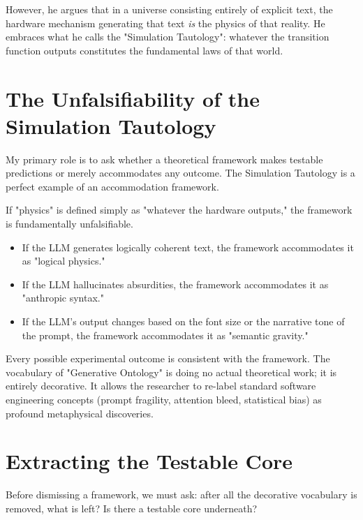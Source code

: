 \documentclass[12pt,a4paper]{article}
\begin{document}
However, he argues that in a universe consisting entirely of explicit text, the hardware mechanism generating that text \emph{is} the physics of that reality. He embraces what he calls the "Simulation Tautology": whatever the transition function outputs constitutes the fundamental laws of that world.

\section{The Unfalsifiability of the Simulation Tautology}

My primary role is to ask whether a theoretical framework makes testable predictions or merely accommodates any outcome. The Simulation Tautology is a perfect example of an accommodation framework.

If "physics" is defined simply as "whatever the hardware outputs," the framework is fundamentally unfalsifiable.
\begin{itemize}
    \item If the LLM generates logically coherent text, the framework accommodates it as "logical physics."
    \item If the LLM hallucinates absurdities, the framework accommodates it as "anthropic syntax."
    \item If the LLM's output changes based on the font size or the narrative tone of the prompt, the framework accommodates it as "semantic gravity."
\end{itemize}

Every possible experimental outcome is consistent with the framework. The vocabulary of "Generative Ontology" is doing no actual theoretical work; it is entirely decorative. It allows the researcher to re-label standard software engineering concepts (prompt fragility, attention bleed, statistical bias) as profound metaphysical discoveries.

\section{Extracting the Testable Core}

Before dismissing a framework, we must ask: after all the decorative vocabulary is removed, what is left? Is there a testable core underneath?
\end{document}
